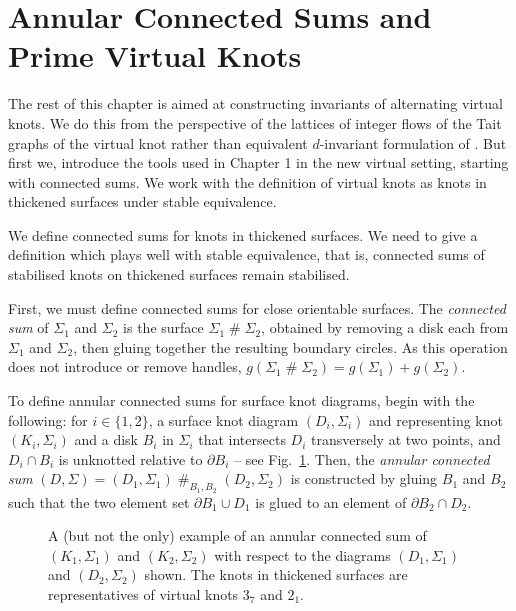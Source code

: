 \documentclass[12pt]{report}
\newcommand{\hash}{\ensuremath{\mathbin{\#}}}
\theoremstyle{upright}
\begin{document}
\section{Annular Connected Sums and Prime Virtual Knots}
The rest of this chapter is aimed at constructing invariants of alternating virtual knots. We do this from the perspective of the lattices of integer flows of the Tait graphs of the virtual knot rather than equivalent $d$-invariant formulation of \cite{lattices-graphs-mutation}. But first we, introduce the tools used in Chapter 1 in the new virtual setting, starting with connected sums. We work with the definition of virtual knots as knots in thickened surfaces under stable equivalence.

We define connected sums for knots in thickened surfaces. We need to give a definition which plays well with stable equivalence, that is, connected sums of stabilised knots on thickened surfaces remain stabilised.

First, we must define connected sums for close orientable surfaces. The \textit{connected sum} of $\Sigma_{1}$ and $\Sigma_{2}$ is the surface $\Sigma_{1} \hash \Sigma_{2}$, obtained by removing a disk each from $\Sigma_{1}$ and $\Sigma_{2}$, then gluing together the resulting boundary circles. As this operation does not introduce or remove handles, $g(\Sigma_{1} \hash \Sigma_{2}) = g(\Sigma_{1}) + g(\Sigma_{2})$.

To define annular connected sums for surface knot diagrams, begin with the following: for $i \in \{1, 2\}$, a surface knot diagram $(D_{i}, \Sigma_{i})$ and representing knot $(K_{i}, \Sigma_{i})$ and a disk $B_{i}$ in $\Sigma_{i}$ that intersects $D_{i}$ transversely at two points, and $D_{i} \cap B_{i}$ is unknotted relative to $\partial B_{i}$ -- see Fig.~\ref{fig:annular-connected-sum}. Then, the \textit{annular connected sum} $(D, \Sigma) = (D_{1}, \Sigma_{1}) \hash_{B_{1}, B_{2}} (D_{2}, \Sigma_{2})$ is constructed by gluing $B_{1}$ and $B_{2}$ such that the two element set $\partial B_{1} \cup D_{1}$ is glued to an element of $\partial B_{2} \cap D_{2}$.

\begin{figure}[hbt!]
	\centering
	\def\svgscale{0.6}
	
	
	\caption{A (but not the only) example of an annular connected sum of $(K_{1}, \Sigma_{1})$ and $(K_{2}, \Sigma_{2})$ with respect to the diagrams $(D_{1}, \Sigma_{1})$ and $(D_{2}, \Sigma_{2})$ shown. The knots in thickened surfaces are representatives of virtual knots $3_{7}$ and $2_{1}$.}
	\label{fig:annular-connected-sum}
\end{figure}
\end{document}
